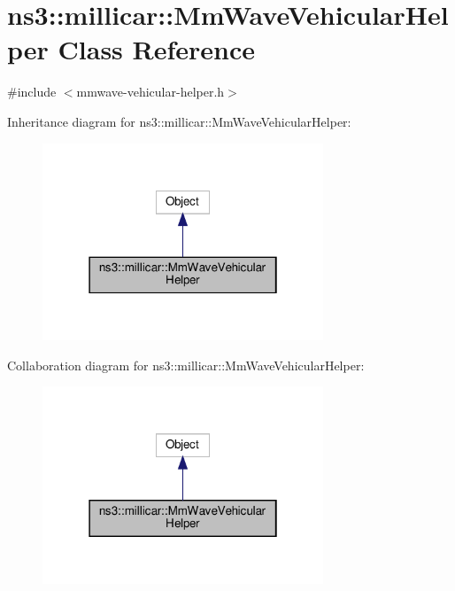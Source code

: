 \hypertarget{classns3_1_1millicar_1_1MmWaveVehicularHelper}{}\section{ns3\+:\+:millicar\+:\+:Mm\+Wave\+Vehicular\+Helper Class Reference}
\label{classns3_1_1millicar_1_1MmWaveVehicularHelper}


{\ttfamily \#include $<$mmwave-\/vehicular-\/helper.\+h$>$}



Inheritance diagram for ns3\+:\+:millicar\+:\+:Mm\+Wave\+Vehicular\+Helper\+:\nopagebreak
\begin{figure}[H]
\begin{center}
\leavevmode
\includegraphics[width=238pt]{classns3_1_1millicar_1_1MmWaveVehicularHelper__inherit__graph}
\end{center}
\end{figure}


Collaboration diagram for ns3\+:\+:millicar\+:\+:Mm\+Wave\+Vehicular\+Helper\+:\nopagebreak
\begin{figure}[H]
\begin{center}
\leavevmode
\includegraphics[width=238pt]{classns3_1_1millicar_1_1MmWaveVehicularHelper__coll__graph}
\end{center}
\end{figure}
